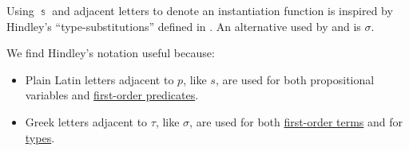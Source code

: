 \begin{remark}\label{rem:substitution_symbol}
  Using \( \Bbbs \) and adjacent letters to denote an instantiation function is inspired by Hindley's \enquote{type-substitutions} defined in \cite[def. 3A1]{Hindley1997BasicSTT}. An alternative used by \textcite[\S 5.4]{Mimram2020ProgramEqualsProof} and \textcite[def. 3.1.3]{CitkinMuravitsky2022ConsequenceRelations} is \( \sigma \).

  We find Hindley's notation useful because:
  \begin{itemize}
    \item Plain Latin letters adjacent to \( p \), like \( s \), are used for both propositional variables and \hyperref[def:fol_signature/predicate]{first-order predicates}.
    \item Greek letters adjacent to \( \tau \), like \( \sigma \), are used for both \hyperref[def:fol_term]{first-order terms} and for \hyperref[rem:type_theory]{types}.
  \end{itemize}
\end{remark}

